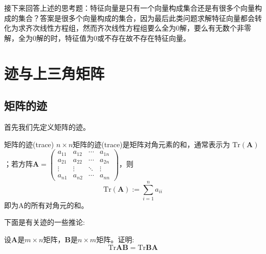 接下来回答上述的思考题：特征向量是只有一个向量构成集合还是有很多个向量构成的集合？答案是很多个向量构成的集合，因为最后此类问题求解特征向量都会转化为求齐次线性方程组，然而齐次线性方程组要么全为0解，要么有无数个非零解，全为0解的时，特征值为0或不存在故不存在特征向量。

\section{迹与上三角矩阵}

\subsection{矩阵的迹}

首先我们先定义矩阵的迹。

\begin{definition}{矩阵的迹(trace)}
		$n\times n$矩阵的迹(trace)是矩阵对角元素的和，通常表示为 $\text{Tr}(\mathbf{A})$；若方阵$\mathbf{A}=\begin{pmatrix}  
  a_{11}& a_{12} & \cdots & a_{1n} \\  
	a_{21}& a_{22} & \cdots & a_{2n} \\ 
  \vdots & \vdots & \ddots & \vdots\\  
  a_{n1} & a_{n2} & \cdots &a_{nn}  
\end{pmatrix} $，则$$\text{Tr}(\mathbf{A}):=\sum_{i=1}^{n}a_{ii} $$即为A的所有对角元的和。
\end{definition}

下面是有关迹的一些推论:

\begin{corollary}
	设$\mathbf{A}$是$m\times n$矩阵，$\mathbf{B}$是$n\times m$矩阵。证明:$$\text{Tr}\mathbf{A}\mathbf{B}=\text{Tr}\mathbf{B}\mathbf{A}$$ 
\end{corollary}

